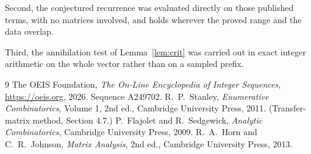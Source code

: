 \documentclass[11pt,a4paper]{article}
\theoremstyle{plain}
\theoremstyle{definition}
\begin{document}
Second, the conjectured recurrence was evaluated directly on those published terms, with no
matrices involved, and holds wherever the proved range and the data overlap.

Third, the annihilation test of Lemma~\ref{lem:crit} was carried out in exact integer
arithmetic on the whole vector rather than on a sampled prefix.

\begin{thebibliography}{9}
 The OEIS Foundation, \emph{The On-Line Encyclopedia of Integer
Sequences}, \url{https://oeis.org}, 2026. Sequence A249702.
 R.~P.~Stanley, \emph{Enumerative Combinatorics}, Volume 1, 2nd ed.,
Cambridge University Press, 2011. (Transfer-matrix method, Section 4.7.)
 P.~Flajolet and R.~Sedgewick, \emph{Analytic Combinatorics}, Cambridge
University Press, 2009.
 R.~A.~Horn and C.~R.~Johnson, \emph{Matrix Analysis}, 2nd ed., Cambridge
University Press, 2013.
\end{thebibliography}
\end{document}
